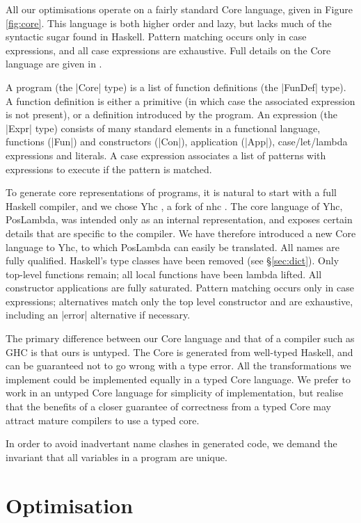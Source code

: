 \documentclass{llncs}
\begin{document}
All our optimisations operate on a fairly standard Core language, given in Figure \ref{fig:core}. This language is both higher order and lazy, but lacks much of the syntactic sugar found in Haskell. Pattern matching occurs only in case expressions, and all case expressions are exhaustive. Full details on the Core language are given in \cite{me:yhc_core}.

A program (the |Core| type) is a list of function definitions (the |FunDef| type). A function definition is either a primitive (in which case the associated expression is not present), or a definition introduced by the program. An expression (the |Expr| type) consists of many standard elements in a functional language, functions (|Fun|) and constructors (|Con|), application (|App|), case/let/lambda expressions and literals. A case expression associates a list of patterns with expressions to execute if the pattern is matched.

To generate core representations of programs, it is natural to start with a full Haskell compiler, and we chose Yhc \cite{me:yhc_core}, a fork of nhc \cite{nhc}. The core language of Yhc, PosLambda, was intended only as an internal representation, and exposes certain details that are specific to the compiler. We have therefore introduced a new Core language to Yhc, to which PosLambda can easily be translated. All names are fully qualified. Haskell's type classes have been removed (see \S\ref{sec:dict}). Only top-level functions remain; all local functions have been lambda lifted. All constructor applications are fully saturated. Pattern matching occurs only in case expressions; alternatives match only the top level constructor and are exhaustive, including an |error| alternative if necessary.

The primary difference between our Core language and that of a compiler such as GHC is that ours is untyped. The Core is generated from well-typed Haskell, and can be guaranteed not to go wrong with a type error. All the transformations we implement could be implemented equally in a typed Core language. We prefer to work in an untyped Core language for simplicity of implementation, but realise that the benefits of a closer guarantee of correctness from a typed Core may attract mature compilers to use a typed core.

In order to avoid inadvertant name clashes in generated code, we demand the invariant that all variables in a program are unique.

\section{Optimisation}
\end{document}

